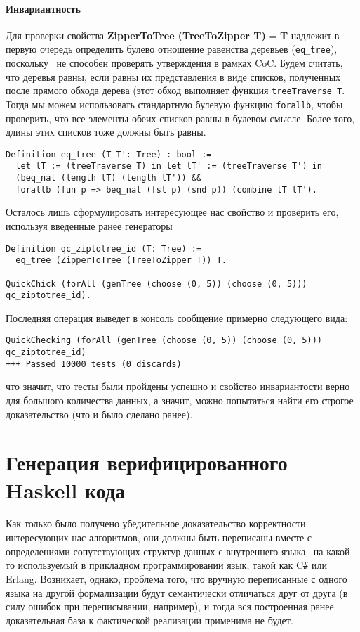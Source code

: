 \paragraph{Инвариантность} Для проверки свойства \textbf{ZipperToTree (TreeToZipper T)} = \textbf{T} надлежит в первую очередь определить булево отношение равенства деревьев (\texttt{eq\_tree}), поскольку \tqc~не способен проверять утверждения в рамках CoC. Будем считать, что деревья равны, если равны их представления в виде списков, полученных после прямого обхода дерева (этот обход выполняет функция \texttt{treeTraverse T}. Тогда мы можем использовать стандартную булевую функцию \texttt{forallb}, чтобы проверить, что все элементы обеих списков равны в булевом смысле. Более того, длины этих списков тоже должны быть равны.
\begin{lstlisting}
Definition eq_tree (T T': Tree) : bool :=
  let lT := (treeTraverse T) in let lT' := (treeTraverse T') in
  (beq_nat (length lT) (length lT')) &&
  forallb (fun p => beq_nat (fst p) (snd p)) (combine lT lT').
\end{lstlisting}

Осталось лишь сформулировать интересующее нас свойство и проверить его, используя введенные ранее генераторы
\begin{lstlisting}
Definition qc_ziptotree_id (T: Tree) :=
  eq_tree (ZipperToTree (TreeToZipper T)) T.
  
QuickChick (forAll (genTree (choose (0, 5)) (choose (0, 5))) qc_ziptotree_id).
\end{lstlisting}

Последняя операция выведет в консоль сообщение примерно следующего вида:
\begin{Verbatim}[fontsize=\scriptsize]
QuickChecking (forAll (genTree (choose (0, 5)) (choose (0, 5))) qc_ziptotree_id)
+++ Passed 10000 tests (0 discards)
\end{Verbatim}
что значит, что тесты были пройдены успешно и свойство инвариантости верно для большого количества данных, а значит, можно попытаться найти его строгое доказательство (что и было сделано ранее).

\section{Генерация верифицированного Haskell кода}
Как только было получено убедительное доказательство корректности интересующих нас алгоритмов, они должны быть переписаны вместе с определениями сопутствующих структур данных с внутреннего языка \tcoq~на какой-то используемый в прикладном программировании язык, такой как C\texttt{\#} или Erlang. Возникает, однако, проблема того, что вручную переписанные с одного языка на другой формализации будут семантически отличаться друг от друга (в силу ошибок при переписывании, например), и тогда вся построенная ранее доказательная база к фактической реализации применима не будет. 

